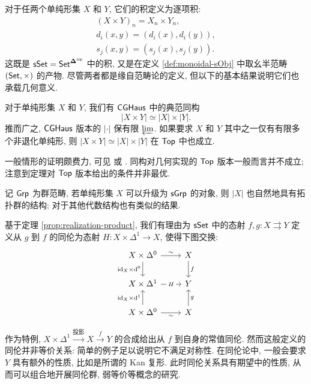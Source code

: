 对于任两个单纯形集 $X$ 和 $Y$, 它们的积定义为逐项积:
\begin{gather*}
	(X \times Y)_n = X_n \times Y_n, \\
	d_i(x, y) = (d_i(x), d_i(y)), \\
	s_j(x, y) = (s_j(x), s_j(y)).
\end{gather*}
这既是 $\mathsf{sSet} = \mathsf{Set}^{\bm\Delta^{\operatorname{op}}}$ 中的积, 又是在定义 \ref{def:monoidal-sObj} 中取幺半范畴 $(\mathsf{Set}, \times)$ 的产物. 尽管两者都是缘自范畴论的定义, 但以下的基本结果说明它们也承载几何意义.

\begin{theorem}\label{prop:realization-product}
	对于单纯形集 $X$ 和 $Y$, 我们有 $\mathsf{CGHaus}$ 中的典范同构
	\[ |X \times Y| \simeq |X| \times |Y|. \]
	推而广之, $\mathsf{CGHaus}$ 版本的 $|\cdot|$ 保有限 $\varprojlim$. 如果要求 $X$ 和 $Y$ 其中之一仅有有限多个非退化单纯形, 则 $|X \times Y| \simeq |X| \times |Y|$ 在 $\mathsf{Top}$ 中也成立. 
\end{theorem}

一般情形的证明颇费力, 可见 \cite[Chapter III]{GZ67} 或 \cite{Dri03}. 同构对几何实现的 $\mathsf{Top}$ 版本一般而言并不成立; 注意到定理对 $\mathsf{Top}$ 版本给出的条件并非最优.

\begin{corollary}
	记 $\mathsf{Grp}$ 为群范畴, 若单纯形集 $X$ 可以升级为 $\mathsf{sGrp}$ 的对象, 则 $|X|$ 也自然地具有拓扑群的结构; 对于其他代数结构也有类似的结果.
\end{corollary}

基于定理 \ref{prop:realization-product}, 我们有理由为 $\mathsf{sSet}$ 中的态射 $f, g: X \rightrightarrows Y$ 定义从 $g$ 到 $f$ 的同伦为态射 $H: X \times \Delta^1 \to X$, 使得下图交换:
\begin{equation}\label{eqn:simplicial-homotopy-prep}
	\begin{tikzcd}
		X \times \Delta^0 \arrow[d, "{\identity_X \times \mathrm{d}^0}"'] \arrow[r, "\sim"] & X \arrow[d, "f"] \\
		X \times \Delta^1 \arrow[r, "H" description] & Y \\
		X \times \Delta^0 \arrow[u, "{\identity_X \times \mathrm{d}^1}"] \arrow[r, "\sim"'] & X \arrow[u, "g"']
	\end{tikzcd}
\end{equation}

作为特例, $X \times \Delta^1 \xrightarrow{\text{投影}} X \xrightarrow{f} Y$ 的合成给出从 $f$ 到自身的常值同伦. 然而这般定义的同伦并非等价关系: 简单的例子足以说明它不满足对称性. 在同伦论中, 一般会要求 $Y$ 具有额外的性质, 比如是所谓的 Kan 复形. 此时同伦关系具有期望中的性质, 从而可以组合地开展同伦群, 弱等价等概念的研究.

